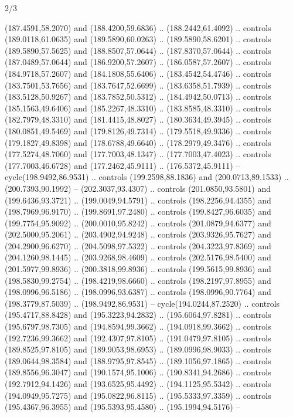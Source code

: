 \begin{flagdescription}{2/3}
\begin{scope}[xshift=0.5\flaglength,yshift=0.5\flagwidth,scale=\flagwidth/180]
\begin{scope}[y=0.8pt, x=0.8pt, yscale=-1,shift={(-168.75,-108.75)}]
  (187.4591,58.2070) and (188.4200,59.6836) .. (188.2442,61.4092) .. controls
  (189.0118,61.0635) and (189.5890,60.0263) .. (189.5890,58.6201) .. controls
  (189.5890,57.5625) and (188.8507,57.0644) .. (187.8370,57.0644) .. controls
  (187.0489,57.0644) and (186.9200,57.2607) .. (186.0587,57.2607) .. controls
  (184.9718,57.2607) and (184.1808,55.6406) .. (183.4542,54.4746) .. controls
  (183.7501,53.7656) and (183.7647,52.6699) .. (183.6358,51.7939) .. controls
  (183.5128,50.9267) and (183.7852,50.5312) .. (184.4942,50.0713) .. controls
  (185.1563,49.6406) and (185.2267,48.3310) .. (183.8585,48.3310) .. controls
  (182.7979,48.3310) and (181.4415,48.8027) .. (180.3634,49.3945) .. controls
  (180.0851,49.5469) and (179.8126,49.7314) .. (179.5518,49.9336) .. controls
  (179.1827,49.8398) and (178.6788,49.6640) .. (178.2979,49.3476) .. controls
  (177.5274,48.7060) and (177.7003,48.1347) .. (177.7003,47.4023) .. controls
  (177.7003,46.6728) and (177.2462,45.9111) .. (176.5372,45.9111) --
  cycle(198.9492,86.9531) .. controls (199.2598,88.1836) and (200.0713,89.1533)
  .. (200.7393,90.1992) -- (202.3037,93.4307) .. controls (201.0850,93.5801) and
  (199.6436,93.3721) .. (199.0049,94.5791) .. controls (198.2256,94.4355) and
  (198.7969,96.9170) .. (199.8691,97.2480) .. controls (199.8427,96.6035) and
  (199.7754,95.9092) .. (200.0010,95.8242) .. controls (201.0879,94.6377) and
  (202.5000,95.2061) .. (203.4902,94.9248) .. controls (203.9326,95.7627) and
  (204.2900,96.6270) .. (204.5098,97.5322) .. controls (204.3223,97.8369) and
  (204.1260,98.1445) .. (203.9268,98.4609) .. controls (202.5176,98.5400) and
  (201.5977,99.8936) .. (200.3818,99.8936) .. controls (199.5615,99.8936) and
  (198.5830,99.2754) .. (198.4219,98.6660) .. controls (198.2197,97.8955) and
  (198.0996,96.5186) .. (198.0996,93.6387) .. controls (198.0996,90.7764) and
  (198.3779,87.5039) .. (198.9492,86.9531) -- cycle(194.0244,87.2520) ..
  controls (195.4717,88.8428) and (195.3223,94.2832) .. (195.6064,97.8281) ..
  controls (195.6797,98.7305) and (194.8594,99.3662) .. (194.0918,99.3662) ..
  controls (192.7236,99.3662) and (192.4307,97.8105) .. (191.0479,97.8105) ..
  controls (189.8525,97.8105) and (189.9053,98.6953) .. (189.0996,98.9033) ..
  controls (189.0644,98.3584) and (188.9795,97.8545) .. (189.1056,97.1865) ..
  controls (189.8556,96.3047) and (190.1574,95.1006) .. (190.8341,94.2686) ..
  controls (192.7912,94.1426) and (193.6525,95.4492) .. (194.1125,95.5342) ..
  controls (194.0949,95.7275) and (195.0822,96.8115) .. (195.5333,97.3359) ..
  controls (195.4367,96.3955) and (195.5393,95.4580) .. (195.1994,94.5176) --

\end{scope}
\end{scope}
\end{flagdescription}
